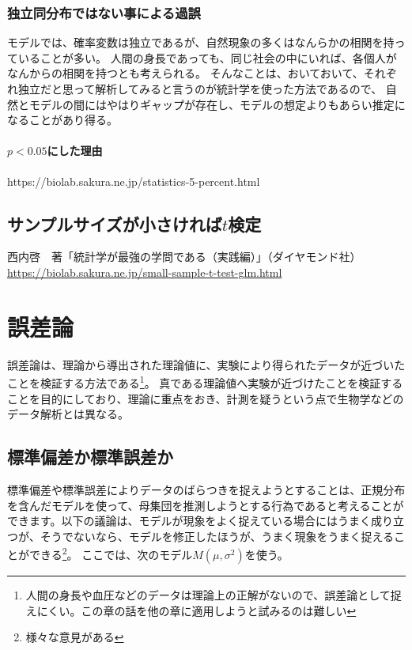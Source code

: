 \documentclass[a4paper,11pt,dvipdfmx]{jsarticle}
\begin{document}
\subsubsection{独立同分布ではない事による過誤}
モデルでは、確率変数は独立であるが、自然現象の多くはなんらかの相関を持っていることが多い。
人間の身長であっても、同じ社会の中にいれば、各個人がなんからの相関を持つとも考えられる。
そんなことは、おいておいて、それぞれ独立だと思って解析してみると言うのが統計学を使った方法であるので、
自然とモデルの間にはやはりギャップが存在し、モデルの想定よりもあらい推定になることがあり得る。

\paragraph{$p<0.05$にした理由}
https://biolab.sakura.ne.jp/statistics-5-percent.html
\fi



\subsection{サンプルサイズが小さければ$t$検定}
西内啓　著「統計学が最強の学問である（実践編）」（ダイヤモンド社）
\url{https://biolab.sakura.ne.jp/small-sample-t-test-glm.html}
\fi 


\section{誤差論}
誤差論は、理論から導出された理論値に、実験により得られたデータが近づいたことを検証する方法である\footnote{人間の身長や血圧などのデータは理論上の正解がないので、誤差論として捉えにくい。この章の話を他の章に適用しようと試みるのは難しい}。
真である理論値へ実験が近づけたことを検証することを目的にしており、理論に重点をおき、計測を疑うという点で生物学などのデータ解析とは異なる。

\subsection{標準偏差か標準誤差か}
標準偏差や標準誤差によりデータのばらつきを捉えようとすることは、正規分布を含んだモデルを使って、母集団を推測しようとする行為であると考えることができます。以下の議論は、モデルが現象をよく捉えている場合にはうまく成り立つが、そうでないなら、モデルを修正したほうが、うまく現象をうまく捉えることができる\footnote{様々な意見がある\cite{SUZUKI_SESD,池田郁男2013統計検定を理解せずに使っている人のために,池田郁男2019改訂増補版}}。
ここでは、次のモデル$M(\mu,\sigma^2)$を使う。
\end{document}

